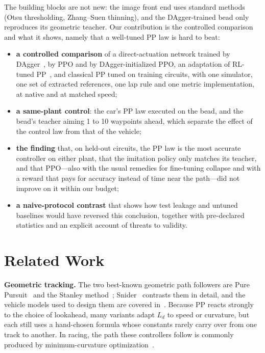 \documentclass[conference]{IEEEtran}
\begin{document}
The building blocks are not new: the image front end uses standard methods (Otsu thresholding, Zhang--Suen thinning), and the DAgger-trained bead only reproduces its geometric teacher. Our contribution is the controlled comparison and what it shows, namely that a well-tuned PP law is hard to beat:
\begin{itemize}
\item \textbf{a controlled comparison} of a direct-actuation network trained by DAgger~\cite{ross2011}, by PPO and by DAgger-initialized PPO, an adaptation of RL-tuned PP~\cite{elgouhary2026}, and classical PP tuned on training circuits, with one simulator, one set of extracted references, one lap rule and one metric implementation, at native and at matched speed;
\item \textbf{a same-plant control}: the car's PP law executed on the bead, and the bead's teacher aiming 1 to 10 waypoints ahead, which separate the effect of the control law from that of the vehicle;
\item \textbf{the finding} that, on held-out circuits, the PP law is the most accurate controller on either plant, that the imitation policy only matches its teacher, and that PPO---also with the usual remedies for fine-tuning collapse and with a reward that pays for accuracy instead of time near the path---did not improve on it within our budget;
\item \textbf{a naive-protocol contrast} that shows how test leakage and untuned baselines would have reversed this conclusion, together with pre-declared statistics and an explicit account of threats to validity.
\end{itemize}

\section{Related Work}
\textbf{Geometric tracking.} The two best-known geometric path followers are Pure Pursuit~\cite{coulter1992} and the Stanley method~\cite{hoffmann2007}; Snider~\cite{snider2009} contrasts them in detail, and the vehicle models used to design them are covered in~\cite{rajamani2012,kong2015}. Because PP reacts strongly to the choice of lookahead, many variants adapt $L_d$ to speed or curvature, but each still uses a hand-chosen formula whose constants rarely carry over from one track to another. In racing, the path these controllers follow is commonly produced by minimum-curvature optimization~\cite{heilmeier2020,betz2022}.
\end{document}
